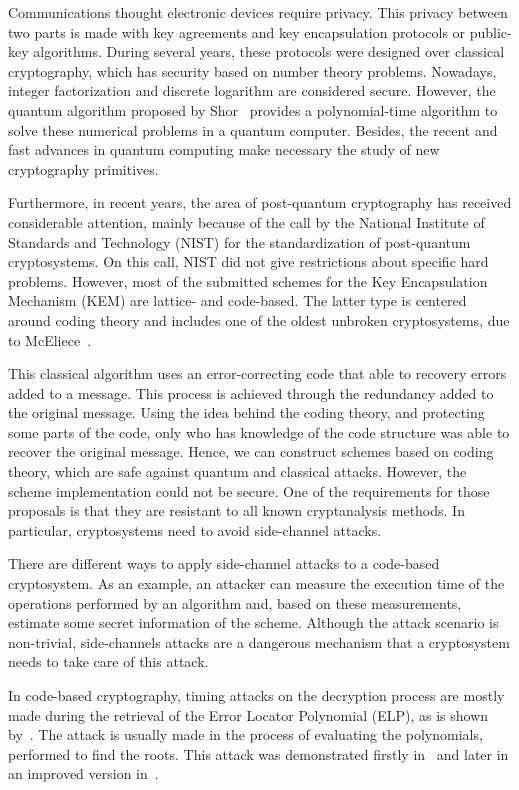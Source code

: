 Communications thought electronic devices require privacy. This privacy between two parts is made with key agreements and key encapsulation protocols or public-key algorithms. During several years, these protocols were designed over classical cryptography, which has security based on number theory problems. Nowadays, integer factorization and discrete logarithm are considered secure. However, the quantum algorithm proposed by Shor~\cite{shor1999polynomial} provides a polynomial-time algorithm to solve these numerical problems in a quantum computer. Besides, the recent and fast advances in quantum computing make necessary the study of new cryptography primitives. 

Furthermore, in recent years, the area of post-quantum cryptography has received considerable attention, mainly because of the call by the National Institute of Standards and Technology (NIST) for the standardization of post-quantum cryptosystems. On this call, NIST did not give restrictions about specific hard problems. However, most of the submitted schemes for the Key Encapsulation Mechanism (KEM) are lattice- and code-based. The latter type is centered around coding theory and includes one of the oldest unbroken cryptosystems, due to McEliece~\cite{mceliece1978public}.

This classical algorithm uses an error-correcting code that able to recovery errors added to a message. This process is achieved through the redundancy added to the original message. Using the idea behind the coding theory, and protecting some parts of the code, only who has knowledge of the code structure was able to recover the original message. Hence, we can construct schemes based on coding theory, which are safe against quantum and classical attacks. However, the scheme implementation could not be secure. One of the requirements for those proposals is that they are resistant to all known cryptanalysis methods. In particular, cryptosystems need to avoid side-channel attacks.

There are different ways to apply side-channel attacks to a code-based cryptosystem. As an example, an attacker can measure the execution time of the operations performed by an algorithm and, based on these measurements, estimate some secret information of the scheme. Although the attack scenario is non-trivial, side-channels attacks are a dangerous mechanism that a cryptosystem needs to take care of this attack.
 
In code-based cryptography, timing attacks on the decryption process are mostly made during the retrieval of the Error Locator Polynomial (ELP), as is shown by~\cite{shoufan2009timing}. The attack is usually made in the process of evaluating the polynomials, performed to find the roots. This attack was demonstrated firstly in~\cite{shoufan2009timing} and later in an improved version in~\cite{bucerzan2017improved}.

